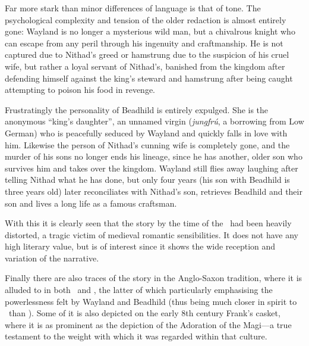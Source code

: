 Far more stark than minor differences of language is that of tone. The psychological complexity and tension of the older redaction is almost entirely gone: Wayland is no longer a mysterious wild man, but a chivalrous knight who can escape from any peril through his ingenuity and craftmanship. He is not captured due to Nithad’s greed or hamstrung due to the suspicion of his cruel wife, but rather a loyal servant of Nithad’s, banished from the kingdom after defending himself against the king’s steward and hamstrung after being caught attempting to poison his food in revenge.

Frustratingly the personality of Beadhild is entirely expulged. She is the anonymous “king’s daughter”, an unnamed virgin (\emph{jungfrú}, a borrowing from Low German) who is peacefully seduced by Wayland and quickly falls in love with him. Likewise the person of Nithad’s cunning wife is completely gone, and the murder of his sons no longer ends his lineage, since he has another, older son who survives him and takes over the kingdom. Wayland still flies away laughing after telling Nithad what he has done, but only four years (his son with Beadhild is three years old) later reconciliates with Nithad’s son, retrieves Beadhild and their son and lives a long life as a famous craftsman.

With this it is clearly seen that the story by the time of the \ThidreksSaga\ had been heavily distorted, a tragic victim of medieval romantic sensibilities. It does not have any high literary value, but is of interest since it shows the wide reception and variation of the narrative.

Finally there are also traces of the story in the Anglo-Saxon tradition, where it is alluded to in both \Waldere\ and \Deor, the latter of which particularly emphasising the powerlessness felt by Wayland and Beadhild (thus being much closer in spirit to \Volundarkvida\ than \ThidreksSaga). Some of it is also depicted on the early 8th century Frank’s casket, where it is as prominent as the depiction of the Adoration of the Magi—a true testament to the weight with which it was regarded within that culture.

